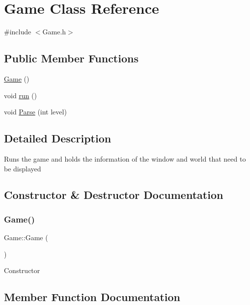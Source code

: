 \hypertarget{classGame}{}\section{Game Class Reference}
\label{classGame}


{\ttfamily \#include $<$Game.\+h$>$}

\subsection*{Public Member Functions}
\begin{DoxyCompactItemize}
\item 
\hyperlink{classGame_ad59df6562a58a614fda24622d3715b65}{Game} ()
\item 
void \hyperlink{classGame_a1ab78f5ed0d5ea879157357cf2fb2afa}{run} ()
\item 
void \hyperlink{classGame_ae878cc28aa5519f8ba8e1ab6d3a33d25}{Parse} (int level)
\end{DoxyCompactItemize}


\subsection{Detailed Description}
Runs the game and holds the information of the window and world that need to be displayed 

\subsection{Constructor \& Destructor Documentation}
\mbox{\label{classGame_ad59df6562a58a614fda24622d3715b65}} 
\subsubsection{\texorpdfstring{Game()}{Game()}}
{\footnotesize\ttfamily Game\+::\+Game (\begin{DoxyParamCaption}{ }\end{DoxyParamCaption})}

Constructor 

\subsection{Member Function Documentation}
\mbox{\label{classGame_ae878cc28aa5519f8ba8e1ab6d3a33d25}} 
